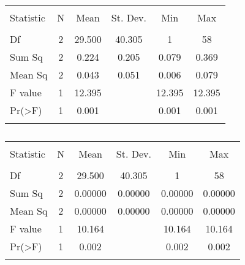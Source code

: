 \begin{table}[!htbp] \centering 
  \caption{} 
  \label{} 
\begin{tabular}{@{\extracolsep{5pt}}lccccc} 
\\[-1.8ex]\hline 
\hline \\[-1.8ex] 
Statistic & \multicolumn{1}{c}{N} & \multicolumn{1}{c}{Mean} & \multicolumn{1}{c}{St. Dev.} & \multicolumn{1}{c}{Min} & \multicolumn{1}{c}{Max} \\ 
\hline \\[-1.8ex] 
Df & 2 & 29.500 & 40.305 & 1 & 58 \\ 
Sum Sq & 2 & 0.224 & 0.205 & 0.079 & 0.369 \\ 
Mean Sq & 2 & 0.043 & 0.051 & 0.006 & 0.079 \\ 
F value & 1 & 12.395 &  & 12.395 & 12.395 \\ 
Pr(\textgreater F) & 1 & 0.001 &  & 0.001 & 0.001 \\ 
\hline \\[-1.8ex] 
\end{tabular} 
\end{table} 

\begin{table}[!htbp] \centering 
  \caption{} 
  \label{} 
\begin{tabular}{@{\extracolsep{5pt}}lccccc} 
\\[-1.8ex]\hline 
\hline \\[-1.8ex] 
Statistic & \multicolumn{1}{c}{N} & \multicolumn{1}{c}{Mean} & \multicolumn{1}{c}{St. Dev.} & \multicolumn{1}{c}{Min} & \multicolumn{1}{c}{Max} \\ 
\hline \\[-1.8ex] 
Df & 2 & 29.500 & 40.305 & 1 & 58 \\ 
Sum Sq & 2 & 0.00000 & 0.00000 & 0.00000 & 0.00000 \\ 
Mean Sq & 2 & 0.00000 & 0.00000 & 0.00000 & 0.00000 \\ 
F value & 1 & 10.164 &  & 10.164 & 10.164 \\ 
Pr(\textgreater F) & 1 & 0.002 &  & 0.002 & 0.002 \\ 
\hline \\[-1.8ex] 
\end{tabular} 
\end{table} 

